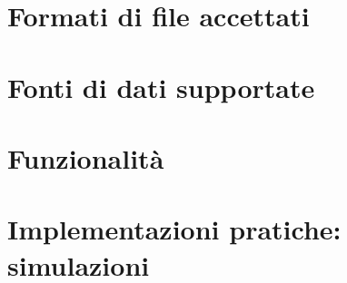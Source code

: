 \documentclass{article}
\begin{document}
\section{Formati di file accettati}

\section{Fonti di dati supportate}

\section{Funzionalità}

\section{Implementazioni pratiche: simulazioni}
\end{document}
